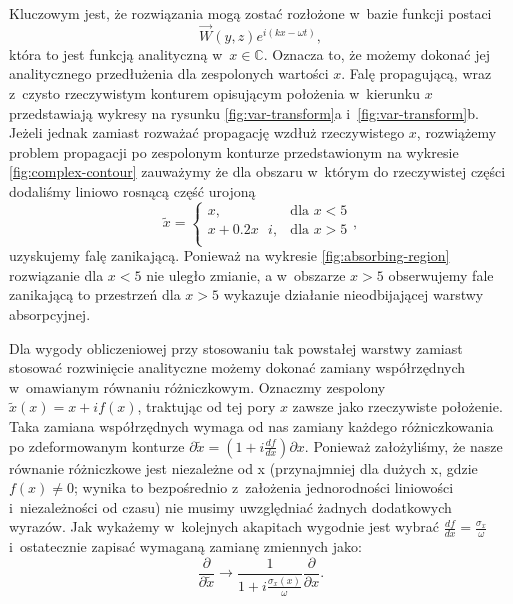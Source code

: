 Kluczowym jest, że rozwiązania mogą zostać rozłożone w~bazie funkcji postaci
\begin{equation}
\vec{W}(y,z)e^{i(kx-\omega t)},
\end{equation}
która to jest funkcją analityczną w~$x\in \mathbb{C}$. Oznacza to, że możemy dokonać jej analitycznego przedłużenia dla zespolonych wartości $x$. Falę propagującą, wraz z~czysto rzeczywistym konturem opisującym położenia w~kierunku $x$ przedstawiają wykresy na rysunku \ref{fig:var-transform}a i~\ref{fig:var-transform}b. Jeżeli jednak zamiast rozważać propagację wzdłuż rzeczywistego $x$, rozwiążemy problem propagacji po zespolonym konturze przedstawionym na wykresie \ref{fig:complex-contour} zauważymy że dla obszaru w~którym do rzeczywistej części dodaliśmy liniowo rosnącą część urojoną
\begin{equation}
\tilde{x}=  
\begin{cases} 
        x, & \mbox{dla } x< 5 \\ 
        x+0.2x\mbox{ }i, & \mbox{dla } x>5 \\
\end{cases},
\end{equation}
 uzyskujemy falę zanikającą. Ponieważ na wykresie \ref{fig:absorbing-region} rozwiązanie dla $x<5$ nie uległo zmianie, a w~obszarze $x>5$ obserwujemy fale zanikającą to przestrzeń dla $x>5$ wykazuje działanie nieodbijającej warstwy absorpcyjnej.

Dla wygody obliczeniowej przy stosowaniu tak powstałej warstwy zamiast stosować rozwinięcie analityczne możemy dokonać zamiany współrzędnych w~omawianym równaniu różniczkowym. Oznaczmy zespolony $\tilde{x}(x)=x+if(x)$, traktując od tej pory $x$ zawsze jako rzeczywiste położenie. Taka zamiana współrzędnych wymaga od nas zamiany każdego różniczkowania po zdeformowanym konturze $\partial \tilde{x} = (1+i\frac{df}{dx}) \partial x$. Ponieważ założyliśmy, że nasze równanie różniczkowe jest niezależne od x (przynajmniej dla dużych x, gdzie $f(x)\ne0$; wynika to bezpośrednio z~założenia jednorodności liniowości i~niezależności od czasu) nie musimy uwzględniać żadnych dodatkowych wyrazów. Jak wykażemy w~kolejnych akapitach wygodnie jest wybrać $\frac{df}{dx}=\frac{\sigma_x}{\omega}$ i~ostatecznie zapisać wymaganą zamianę zmiennych jako:
\begin{equation}
	\frac{\partial}{\partial \tilde{x}} \to \frac{1} {1+i \frac{\sigma_x(x)}{\omega}} \frac{\partial}{\partial x}.
	\label{eq:pml-variable-change}
\end{equation}

